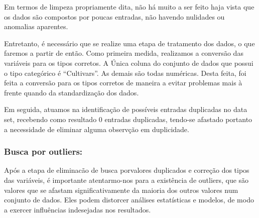 \documentclass[
  letterpaper,
  DIV=11,
  numbers=noendperiod]{scrartcl}
\begin{document}
Em termos de limpeza propriamente dita, não há muito a ser feito haja
vista que os dados são compostos por poucas entradas, não havendo
nulidades ou anomalias aparentes.

Entretanto, é necessário que se realize uma etapa de tratamento dos
dados, o que faremos a partir de então. Como primeira medida, realizamos
a conversão das variáveis para os tipos corretos. A Única coluna do
conjunto de dados que possui o tipo categórico é ``Cultivars''. As
demais são todas numéricas. Desta feita, foi feita a conversão para os
tipos corretos de maneira a evitar problemas mais à frente quando da
standardização dos dados.

Em seguida, atuamos na identificação de possíveis entradas duplicadas no
data set, recebendo como resultado 0 entradas duplicadas, tendo-se
afastado portanto a necessidade de eliminar alguma observção em
duplicidade.

\subsubsection{Busca por outliers:}\label{busca-por-outliers}

Após a etapa de eliminacão de busca porvalores duplicados e correção dos
tipos das variáveis, é importante atentarmo-nos para a existência de
outliers, que são valores que se afastam significativamente da maioria
dos outros valores num conjunto de dados. Eles podem distorcer análises
estatísticas e modelos, de modo a exercer influências indesejadas nos
resultados.
\end{document}
